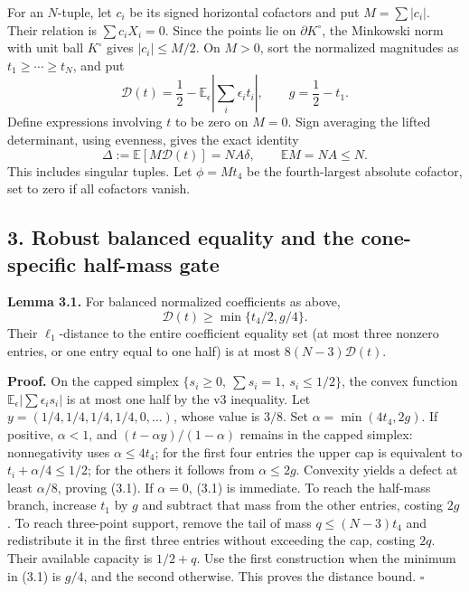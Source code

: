 \documentclass[
  11pt,
]{article}
\begin{document}
For an \(N\)-tuple, let \(c_i\) be its signed horizontal cofactors and
put \(M=\sum|c_i|\). Their relation is \(\sum c_iX_i=0\). Since the
points lie on \(\partial K^\circ\), the Minkowski norm with unit ball
\(K^\circ\) gives \(|c_i|\le M/2\). On \(M>0\), sort the normalized
magnitudes as \(t_1\ge\cdots\ge t_N\), and put \[
 \mathscr D(t)=\frac12-
        \mathbb E_\epsilon\left|\sum_i\epsilon_i t_i\right|,
 \qquad g=\frac12-t_1.
\] Define expressions involving \(t\) to be zero on \(M=0\). Sign
averaging the lifted determinant, using evenness, gives the exact
identity \[
 \Delta:=\mathbb E[M\mathscr D(t)]=NA\delta,
 \qquad \mathbb E M=NA\le N.                                   \tag{2.4}
\] This includes singular tuples. Let \(\phi=Mt_4\) be the
fourth-largest absolute cofactor, set to zero if all cofactors vanish.

\subsection{3. Robust balanced equality and the cone-specific half-mass
gate}\label{robust-balanced-equality-and-the-cone-specific-half-mass-gate}

\textbf{Lemma 3.1.} For balanced normalized coefficients as above, \[
 \mathscr D(t)\ge\min\{t_4/2,g/4\}.                             \tag{3.1}
\] Their \(\ell_1\)-distance to the entire coefficient equality set (at
most three nonzero entries, or one entry equal to one half) is at most
\(8(N-3)\mathscr D(t)\).

\textbf{Proof.} On the capped simplex
\(\{s_i\ge0,\ \sum s_i=1,\ s_i\le1/2\}\), the convex function
\(\mathbb E_\epsilon|\sum\epsilon_i s_i|\) is at most one half by the v3
inequality. Let \(y=(1/4,1/4,1/4,1/4,0,\ldots)\), whose value is
\(3/8\). Set \(\alpha=\min(4t_4,2g)\). If positive, \(\alpha<1\), and
\((t-\alpha y)/(1-\alpha)\) remains in the capped simplex: nonnegativity
uses \(\alpha\le4t_4\); for the first four entries the upper cap is
equivalent to \(t_i+\alpha/4\le1/2\); for the others it follows from
\(\alpha\le2g\). Convexity yields a defect at least \(\alpha/8\),
proving (3.1). If \(\alpha=0\), (3.1) is immediate. To reach the
half-mass branch, increase \(t_1\) by \(g\) and subtract that mass from
the other entries, costing \(2g\). To reach three-point support, remove
the tail of mass \(q\le(N-3)t_4\) and redistribute it in the first three
entries without exceeding the cap, costing \(2q\). Their available
capacity is \(1/2+q\). Use the first construction when the minimum in
(3.1) is \(g/4\), and the second otherwise. This proves the distance
bound. \(\square\)
\end{document}
